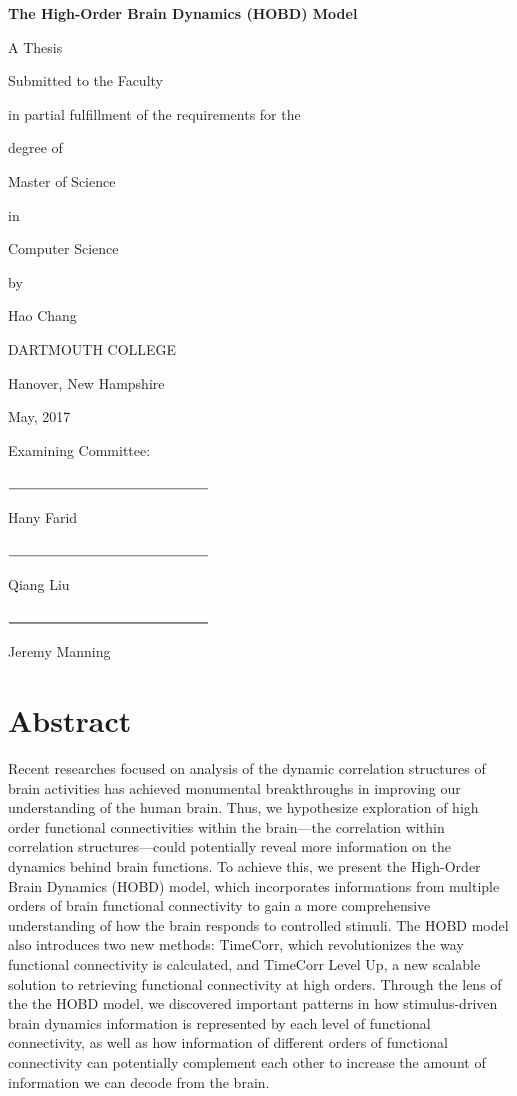 \documentclass[11pt]{article}
\begin{document}
{\centering
  \textbf{The High-Order Brain Dynamics (HOBD) Model}\par
  A Thesis\par
  Submitted to the Faculty\par
  in partial fulfillment of the requirements for the\par
  degree of\par
  Master of Science\par
  in\par
  Computer Science\par
  by\par
  Hao Chang\par
  DARTMOUTH COLLEGE\par
  Hanover, New Hampshire\par
  May, 2017\par
}
\vspace{5mm}
\setlength{\parskip}{0em}
\begin{flushright}
Examining Committee:\par
\vspace{5mm}
$\rule{5cm}{0.15mm}$\par
Hany Farid\par
\vspace{5mm}
$\rule{5cm}{0.15mm}$\par
Qiang Liu\par
\vspace{5mm}
$\rule{5cm}{0.25mm}$\par
Jeremy Manning\par
\end{flushright}
\setlength{\parskip}{1em}
\newpage


\null\par
\newpage
{}
\section{Abstract}
Recent researches focused on analysis of the dynamic correlation structures of brain activities has achieved monumental breakthroughs in improving our understanding of the human brain. Thus, we hypothesize exploration of high order functional connectivities within the brain---the correlation within correlation structures---could potentially reveal more information on the dynamics behind brain functions. To achieve this, we present the High-Order Brain Dynamics (HOBD) model, which incorporates informations from multiple orders of brain functional connectivity to gain a more comprehensive understanding of how the brain responds to controlled stimuli. The HOBD model also introduces two new methods: TimeCorr, which revolutionizes the way functional connectivity is calculated, and TimeCorr Level Up, a new scalable solution to retrieving functional connectivity at high orders. Through the lens of the the HOBD model, we discovered important patterns in how stimulus-driven brain dynamics information is represented by each level of functional connectivity, as well as how information of different orders of functional connectivity can potentially complement each other to increase the amount of information we can decode from the brain.
\end{document}
